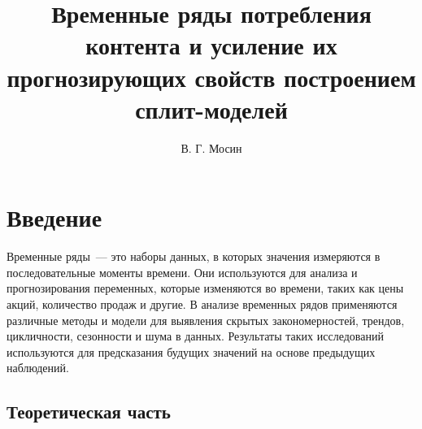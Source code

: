 \documentclass[a4paper,12pt]{article}
\title{Временные ряды потребления контента и усиление их прогнозирующих свойств построением сплит-моделей}
\author{В. Г. Мосин}
\date{}
\begin{document}
	\maketitle
	
\tableofcontents
	
\section{Введение}
Временные ряды — это наборы данных, в которых значения измеряются в последовательные моменты времени. Они используются для анализа и прогнозирования переменных, которые изменяются во времени, таких как цены акций, количество продаж и другие. В анализе временных рядов применяются различные методы и модели для выявления скрытых закономерностей, трендов, цикличности, сезонности и шума в данных. Результаты таких исследований используются для предсказания будущих значений на основе предыдущих наблюдений.

\subsection{Теоретическая часть}
\end{document}
